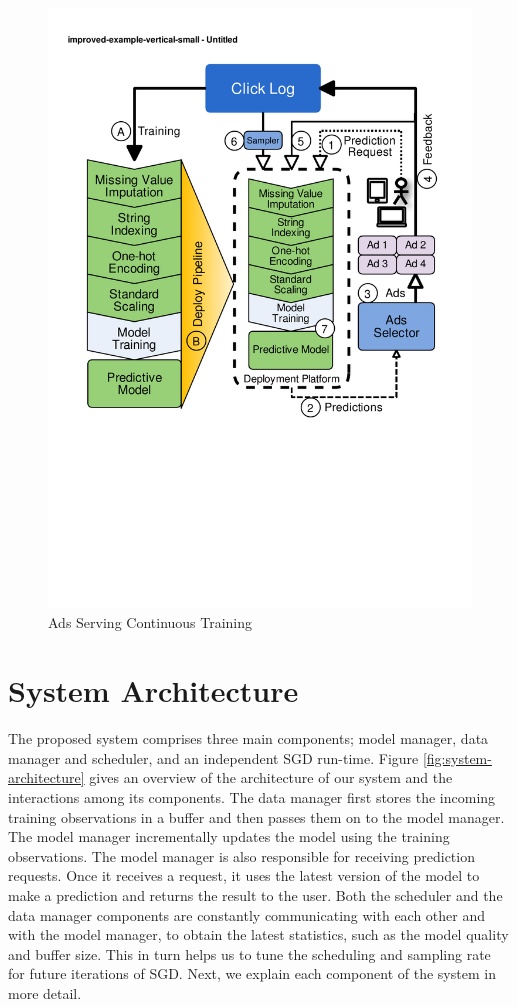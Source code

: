 \begin{figure}[t]
\centering
\includegraphics[width=\columnwidth]{../images/improved-example.pdf}
\caption{Ads Serving Continuous Training}
\label{fig:improved-example}
\end{figure}


\section{System Architecture} \label{sec:system-architecutre}
The proposed system comprises three main components; model manager, data manager and scheduler, and an independent SGD run-time. 
Figure \ref{fig:system-architecture} gives an overview of the architecture of our system and the interactions among its components.
The data manager first stores the incoming training observations in a buffer and then passes them on to the model manager.
The model manager incrementally updates the model using the training observations.
The model manager is also responsible for receiving prediction requests.
Once it receives a request, it uses the latest version of the model to make a prediction and returns the result to the user.
Both the scheduler and the data manager components are constantly communicating with each other and with the model manager, to obtain the latest statistics, such as the model quality and buffer size.
This in turn helps us to tune the scheduling and sampling rate for future iterations of SGD. 
Next, we explain each component of the system in more detail.



